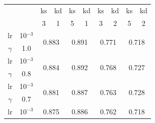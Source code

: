\documentclass[a4paper,12pt,twoside,titlepage]{article}
\begin{document}
\begin{table}[h!]
  \centering
  \begin{tabular}{|cc||cc|cc|cc|cc|}
  \hline
  \multicolumn{2}{|c||}{\multirow{2}{*}{}}    & \multicolumn{1}{c|}{ks}         & kd        & \multicolumn{1}{c|}{ks}         & kd        & \multicolumn{1}{c|}{ks}         & kd        & \multicolumn{1}{c|}{ks}         & kd        \\ \cline{3-10} 
  \multicolumn{2}{|c||}{}                     & \multicolumn{1}{c|}{3}          & 1         & \multicolumn{1}{c|}{5}          & 1         & \multicolumn{1}{c|}{3}          & 2         & \multicolumn{1}{c|}{5}          & 2         \\ \hline\hline
  \multicolumn{1}{|c|}{lr}       & 10$^{-3}$ & \multicolumn{2}{c|}{\multirow{2}{*}{0.883}} & \multicolumn{2}{c|}{\multirow{2}{*}{0.891}} & \multicolumn{2}{c|}{\multirow{2}{*}{0.771}} & \multicolumn{2}{c|}{\multirow{2}{*}{0.718}} \\ \cline{1-2}
  \multicolumn{1}{|c|}{$\gamma$} & 1.0       & \multicolumn{2}{c|}{}                       & \multicolumn{2}{c|}{}                       & \multicolumn{2}{c|}{}                       & \multicolumn{2}{c|}{}                       \\ \hline
  \multicolumn{1}{|c|}{lr}       & 10$^{-3}$ & \multicolumn{2}{c|}{\multirow{2}{*}{0.884}} & \multicolumn{2}{c|}{\multirow{2}{*}{0.892}} & \multicolumn{2}{c|}{\multirow{2}{*}{0.768}} & \multicolumn{2}{c|}{\multirow{2}{*}{0.727}} \\ \cline{1-2}
  \multicolumn{1}{|c|}{$\gamma$} & 0.8       & \multicolumn{2}{c|}{}                       & \multicolumn{2}{c|}{}                       & \multicolumn{2}{c|}{}                       & \multicolumn{2}{c|}{}                       \\ \hline
  \multicolumn{1}{|c|}{lr}       & 10$^{-3}$ & \multicolumn{2}{c|}{\multirow{2}{*}{0.881}} & \multicolumn{2}{c|}{\multirow{2}{*}{0.887}} & \multicolumn{2}{c|}{\multirow{2}{*}{0.763}} & \multicolumn{2}{c|}{\multirow{2}{*}{0.728}} \\ \cline{1-2}
  \multicolumn{1}{|c|}{$\gamma$} & 0.7       & \multicolumn{2}{c|}{}                       & \multicolumn{2}{c|}{}                       & \multicolumn{2}{c|}{}                       & \multicolumn{2}{c|}{}                       \\ \hline
  \multicolumn{1}{|c|}{lr}       & 10$^{-3}$ & \multicolumn{2}{c|}{\multirow{2}{*}{0.875}} & \multicolumn{2}{c|}{\multirow{2}{*}{0.886}} & \multicolumn{2}{c|}{\multirow{2}{*}{0.762}} & \multicolumn{2}{c|}{\multirow{2}{*}{0.718}} \\ \cline{1-2}

\end{tabular}
\end{table}
\end{document}
